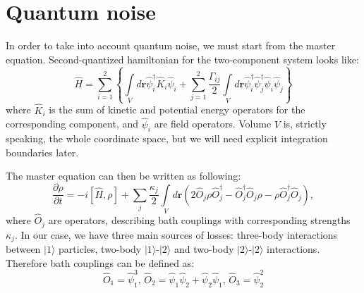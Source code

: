 \documentclass[12pt,notitlepage]{report}
\begin{document}
\section*{Quantum noise}

In order to take into account quantum noise, we must start from the master equation.
Second-quantized hamiltonian for the two-component system looks like:
\[
\hat{H} = \sum\limits^2_{i=1} \left\{ \int\limits_V d\textbf{r} \hat{\psi}_i^\dagger \hat{K}_i \hat{\psi}_i +
\sum\limits^2_{j=1} \frac{\Gamma_{ij}}{2} \int\limits_V d\textbf{r} \hat{\psi}_i^\dagger \hat{\psi}_j^\dagger \hat{\psi}_i \hat{\psi}_j \right\}
\]
where $\hat{K}_i$ is the sum of kinetic and potential energy operators for the corresponding component,
and $\hat{\psi}_i$ are field operators.
Volume $V$ is, strictly speaking, the whole coordinate space, but we will need explicit integration boundaries later.

The master equation can then be written as following:
\[
\frac{\partial\rho}{\partial t} = -i [\hat{H}, \rho] + \sum\limits_j \frac{\kappa_j}{2} \int\limits_V d\textbf{r}
\left( 2  \hat{O}_j \rho \hat{O}_j^\dagger - \hat{O}_j^\dagger \hat{O}_j \rho - \rho \hat{O}_j^\dagger \hat{O}_j \right),
\]
where $\hat{O}_j$ are operators, describing bath couplings with corresponding strengths $\kappa_j$.
In our case, we have three main sources of losses: three-body interactions between $\vert1\rangle$ particles,
two-body $\vert1\rangle$-$\vert2\rangle$ and two-body $\vert2\rangle$-$\vert2\rangle$ interactions.
Therefore bath couplings can be defined as:
\begin{equation}
\label{bath_coupling_operators}
\hat{O}_1 = \hat{\psi}_1^3,\, \hat{O}_2 = \hat{\psi}_1 \hat{\psi}_2 + \hat{\psi}_2 \hat{\psi}_1,\, \hat{O}_3 = \hat{\psi}_2^2
\end{equation}
\end{document}
